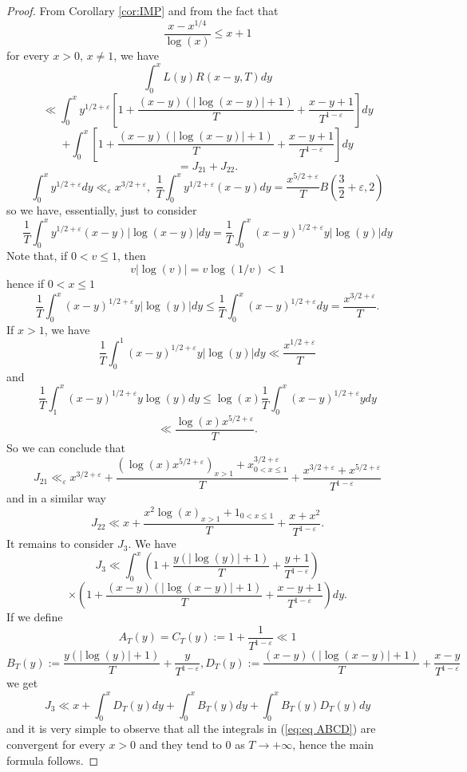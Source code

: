 \documentclass[10pt,a4paper]{amsart}
\begin{document}
\begin{proof}
From Corollary \ref{cor:IMP} and from the fact that $$ \frac{x-x^{1/4}}{\log\left(x\right)}\leq x+1$$ for every $x>0,\,x\neq1$, we have
\[
\int_{0}^{x}L\left(y\right)R\left(x-y,T\right)dy
\]
\[
\ll\int_{0}^{x}y^{1/2+\varepsilon}\left[1+\frac{(x-y)\left(\left|\log\left(x-y\right)\right|+1\right)}{T}+\frac{x-y+1}{T^{1-\varepsilon}}\right]dy
\]
\[
+\int_{0}^{x}\left[1+\frac{(x-y)\left(\left|\log\left(x-y\right)\right|+1\right)}{T}+\frac{x-y+1}{T^{1-\varepsilon}}\right]dy
\]
\[
=J_{21}+J_{22}.
\]
\[
\int_{0}^{x}y^{1/2+\varepsilon}dy\ll_{\varepsilon}x^{3/2+\varepsilon},\,\,\frac{1}{T}\int_{0}^{x}y^{1/2+\varepsilon}(x-y)dy=\frac{x^{5/2+\varepsilon}}{T}B\left(\frac{3}{2}+\varepsilon,2\right)
\]
so we have, essentially, just to consider
\[
\frac{1}{T}\int_{0}^{x}y^{1/2+\varepsilon}(x-y)\left|\log(x-y)\right|dy=\frac{1}{T}\int_{0}^{x}\left(x-y\right)^{1/2+\varepsilon}y\left|\log(y)\right|dy
\]
Note that, if $0<v\leq1$, then
\[
v\left|\log\left(v\right)\right|=v\log\left(1/v\right)<1
\]
hence if $0<x\leq1$
\[
\frac{1}{T}\int_{0}^{x}\left(x-y\right)^{1/2+\varepsilon}y\left|\log(y)\right|dy\leq\frac{1}{T}\int_{0}^{x}\left(x-y\right)^{1/2+\varepsilon}dy=\frac{x^{3/2+\varepsilon}}{T}.
\]
If $x>1$, we have
\[
\frac{1}{T}\int_{0}^{1}\left(x-y\right)^{1/2+\varepsilon}y\left|\log(y)\right|dy\ll\frac{x^{1/2+\varepsilon}}{T}
\]
and
\[
\frac{1}{T}\int_{1}^{x}\left(x-y\right)^{1/2+\varepsilon}y\log(y)dy\leq\log\left(x\right)\frac{1}{T}\int_{0}^{x}\left(x-y\right)^{1/2+\varepsilon}ydy
\]
\[
\ll\frac{\log\left(x\right)x^{5/2+\varepsilon}}{T}.
\]
So we can conclude that
\[
J_{21}\ll_{\varepsilon}x^{3/2+\varepsilon}+\frac{\left(\log\left(x\right)x^{5/2+\varepsilon}\right)_{x>1}+x_{0<x\leq1}^{3/2+\varepsilon}}{T}+\frac{x^{3/2+\varepsilon}+x^{5/2+\varepsilon}}{T^{1-\varepsilon}}
\]
and in a similar way
\[
J_{22}\ll x+\frac{x^{2}\log\left(x\right)_{x>1}+1_{0<x\leq1}}{T}+\frac{x+x^{2}}{T^{1-\varepsilon}}.
\]
It remains to consider $J_{3}.$ We have
\[
J_{3}\ll\int_{0}^{x}\left(1+\frac{y\left(\left|\log\left(y\right)\right|+1\right)}{T}+\frac{y+1}{T^{1-\varepsilon}}\right)
\]
\[
\times\left(1+\frac{\left(x-y\right)\left(\left|\log\left(x-y\right)\right|+1\right)}{T}+\frac{x-y+1}{T^{1-\varepsilon}}\right)dy.
\]
If we define
\[
A_{T}\left(y\right)=C_{T}\left(y\right):=1+\frac{1}{T^{1-\varepsilon}}\ll1
\]
\[
B_{T}\left(y\right):=\frac{y\left(\left|\log\left(y\right)\right|+1\right)}{T}+\frac{y}{T^{1-\varepsilon}},D_{T}\left(y\right):=\frac{\left(x-y\right)\left(\left|\log\left(x-y\right)\right|+1\right)}{T}+\frac{x-y}{T^{1-\varepsilon}}
\]
we get
\begin{equation}
J_{3}\ll x+\int_{0}^{x}D_{T}\left(y\right)dy+\int_{0}^{x}B_{T}\left(y\right)dy+\int_{0}^{x}B_{T}\left(y\right)D_{T}\left(y\right)dy\label{eq:eq ABCD}
\end{equation}
and it is very simple to observe that all the integrals in (\ref{eq:eq ABCD})
are convergent for every $x>0$ and they tend to $0$ as $T\rightarrow+\infty$,
hence the main formula follows.


\end{proof}
\end{document}
